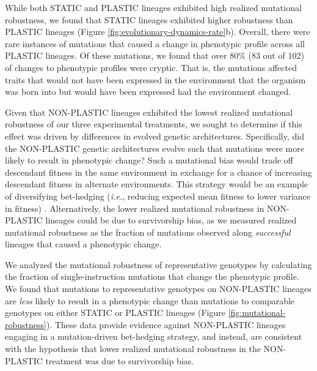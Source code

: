 While both STATIC and PLASTIC lineages exhibited high realized mutational robustness, we found that STATIC lineages exhibited higher robustness than PLASTIC lineages (Figure \ref{fig:evolutionary-dynamics-rate}b). 
Overall, there were rare instances of mutations that caused a change in phenotypic profile across all PLASTIC lineages.
Of these mutations, we found that over 80\% (83 out of 102) of changes to phenotypic profiles were cryptic. 
That is, the mutations affected traits that would not have been expressed in the environment that the organism was born into but would have been expressed had the environment changed.

%
%
%


Given that NON-PLASTIC lineages exhibited the lowest realized mutational robustness of our three experimental treatments, we sought to determine if this effect was driven by differences in evolved genetic architectures.
Specifically, did the NON-PLASTIC genetic architectures evolve such that mutations were more likely to result in phenotypic change?
Such a  mutational bias would trade off descendant fitness in the same environment in exchange for a chance of increasing descendant fitness in alternate environments.
This strategy would be an example of diversifying bet-hedging (\textit{i.e.}, reducing expected mean fitness to lower variance in fitness) \citep{childs2010evolutionary}.
Alternatively, the lower realized mutational robustness in NON-PLASTIC lineages could be due to survivorship bias, as we measured realized mutational robustness as the fraction of mutations observed along \textit{successful} lineages that caused a phenotypic change. 


We analyzed the mutational robustness of representative genotypes by calculating the fraction of single-instruction mutations that change the phenotypic profile.
We found that mutations to representative genotypes on NON-PLASTIC lineages are \textit{less} likely to result in a phenotypic change than mutations to comparable genotypes on either STATIC or PLASTIC lineages (Figure \ref{fig:mutational-robustness}).
These data provide evidence against NON-PLASTIC lineages engaging in a mutation-driven bet-hedging strategy, and instead, are consistent with the hypothesis that lower realized mutational robustness in the NON-PLASTIC treatment was due to survivorship bias.



